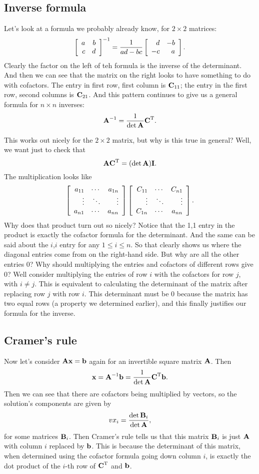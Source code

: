 \subsection{Inverse formula}

Let's look at a formula we probably already know, for $2 \times 2$ matrices:
\[ \left[ \begin{array}{rrrrrrrrrrrrrrrrrrrrrrrrr} a&b\\c&d\\ \end{array} \right]^{-1} = \frac 1{ad-bc}\left[ \begin{array}{rrrrrrrrrrrrrrrrrrrrrrrrr} d&-b\\-c&a\\ \end{array} \right]. \]
Clearly the factor on the left of teh formula is the inverse of the determinant. And then we can see that the matrix on the right looks to have something to do with cofactors. The entry in first row, first column is $\boldsymbol{\mathbf{C}}_{11}$; the entry in the first row, second columns is $\boldsymbol{\mathbf{C}}_{21}$. And this pattern continues to give us a general formula for $n \times n$ inverses:
\[ \boldsymbol{\mathbf{A}}^{-1} = \frac 1{\mathrm{det}\, \boldsymbol{\mathbf{A}}} \boldsymbol{\mathbf{C}}^\mathrm{T}. \]

This works out nicely for the $2 \times 2$ matrix, but why is this true in general? Well, we want just to check that
\[ \boldsymbol{\mathbf{A}}\boldsymbol{\mathbf{C}}^\mathrm{T} = (\mathrm{det}\, \boldsymbol{\mathbf{A}})\boldsymbol{\mathbf{I}}. \]
The multiplication looks like
\[ \left[ \begin{array}{rrrrrrrrrrrrrrrrrrrrrrrrr} a_{11}&\cdots&a_{1n}\\\vdots&\ddots&\vdots\\a_{n1}&\cdots&a_{nn}\\ \end{array} \right]\left[ \begin{array}{rrrrrrrrrrrrrrrrrrrrrrrrr} C_{11}&\cdots&C_{n1}\\\vdots&\ddots&\vdots\\C_{1n}&\cdots&a_{nn}\\ \end{array} \right]. \]
Why does that product turn out so nicely? Notice that the 1,1 entry in the product is exactly the cofactor formula for the determinant. And the same can be said about the $i$,$i$ entry for any $1 \le i \le n$. So that clearly shows us where the diagonal entries come from on the right-hand side. But why are all the other entries 0? Why should multiplying the entries and cofactors of different rows give 0? Well consider multiplying the entries of row $i$ with the cofactors for row $j$, with $i\ne j$. This is equivalent to calculating the determinant of the matrix after replacing row $j$ with row $i$. This determinant must be 0 because the matrix has two equal rows (a property we determined earlier), and this finally justifies our formula for the inverse. 

\subsection{Cramer's rule}

Now let's consider $\boldsymbol{\mathbf{A}} \boldsymbol{\mathbf{x}} = \boldsymbol{\mathbf{b}}$ again for an invertible square matrix $\boldsymbol{\mathbf{A}}$. Then
\[ \boldsymbol{\mathbf{x}} = \boldsymbol{\mathbf{A}}^{-1}\boldsymbol{\mathbf{b}} = \frac 1{\mathrm{det}\, \boldsymbol{\mathbf{A}}} \boldsymbol{\mathbf{C}}^\mathrm{T}\boldsymbol{\mathbf{b}}. \]
Then we can see that there are cofactors being multiplied by vectors, so the solution's components are given by
\[ vx_i = \frac{\mathrm{det}\, \boldsymbol{\mathbf{B}}_i}{\det \boldsymbol{\mathbf{A}}}, \]
for some matrices $\boldsymbol{\mathbf{B}}_i$. Then Cramer's rule tells us that this matrix $\boldsymbol{\mathbf{B}}_i$ is just $\boldsymbol{\mathbf{A}}$ with column $i$ replaced by $\boldsymbol{\mathbf{b}}$. This is because the determinant of this matrix, when determined using the cofactor formula going down column $i$, is exactly the dot product of the $i$-th row of $\boldsymbol{\mathbf{C}}^\mathrm{T}$ and $\boldsymbol{\mathbf{b}}$. 

